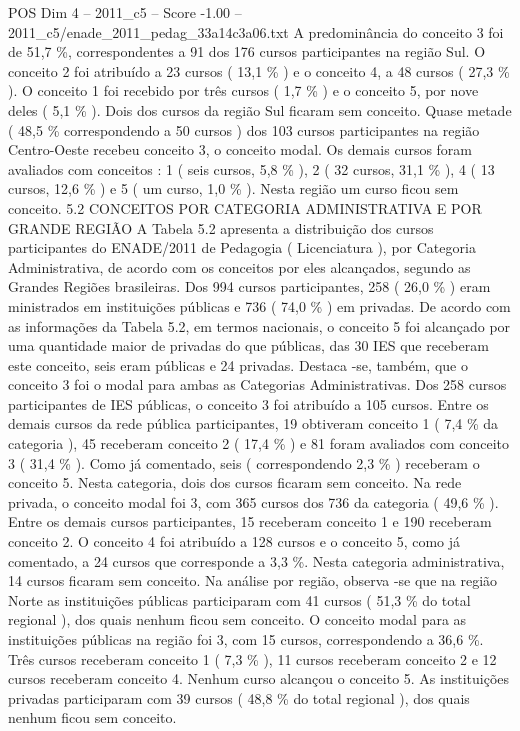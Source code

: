\begin{textsample}{POS Dim 4 – 2011\_c5 – Score -1.00 – 2011\_c5/enade\_2011\_pedag\_33a14c3a06.txt}
A predominância do conceito 3 foi de 51,7 \%, correspondentes a 91 dos 176 cursos participantes na região Sul.
O conceito 2 foi atribuído a 23 cursos ( 13,1 \% ) e o conceito 4, a 48 cursos ( 27,3 \% ).
O conceito 1 foi recebido por três cursos ( 1,7 \% ) e o conceito 5, por nove deles ( 5,1 \% ).
Dois dos cursos da região Sul ficaram sem conceito.
Quase metade ( 48,5 \% correspondendo a 50 cursos ) dos 103 cursos participantes na região Centro-Oeste recebeu conceito 3, o conceito modal.
Os demais cursos foram avaliados com conceitos : 1 ( seis cursos, 5,8 \% ), 2 ( 32 cursos, 31,1 \% ), 4 ( 13 cursos, 12,6 \% ) e 5 ( um curso, 1,0 \% ).
Nesta região um curso ficou sem conceito. 5.2 CONCEITOS POR CATEGORIA ADMINISTRATIVA E POR GRANDE REGIÃO A Tabela 5.2 apresenta a distribuição dos cursos participantes do ENADE/2011 de Pedagogia ( Licenciatura ), por Categoria Administrativa, de acordo com os conceitos por eles alcançados, segundo as Grandes Regiões brasileiras.
Dos 994 cursos participantes, 258 ( 26,0 \% ) eram ministrados em instituições públicas e 736 ( 74,0 \% ) em privadas.
De acordo com as informações da Tabela 5.2, em termos nacionais, o conceito 5 foi alcançado por uma quantidade maior de privadas do que públicas, das 30 IES que receberam este conceito, seis eram públicas e 24 privadas.
Destaca -se, também, que o conceito 3 foi o modal para ambas as Categorias Administrativas.
Dos 258 cursos participantes de IES públicas, o conceito 3 foi atribuído a 105 cursos.
Entre os demais cursos da rede pública participantes, 19 obtiveram conceito 1 ( 7,4 \% da categoria ), 45 receberam conceito 2 ( 17,4 \% ) e 81 foram avaliados com conceito 3 ( 31,4 \% ).
Como já comentado, seis ( correspondendo 2,3 \% ) receberam o conceito 5.
Nesta categoria, dois dos cursos ficaram sem conceito.
Na rede privada, o conceito modal foi 3, com 365 cursos dos 736 da categoria ( 49,6 \% ).
Entre os demais cursos participantes, 15 receberam conceito 1 e 190 receberam conceito 2.
O conceito 4 foi atribuído a 128 cursos e o conceito 5, como já comentado, a 24 cursos que corresponde a 3,3 \%.
Nesta categoria administrativa, 14 cursos ficaram sem conceito.
Na análise por região, observa -se que na região Norte as instituições públicas participaram com 41 cursos ( 51,3 \% do total regional ), dos quais nenhum ficou sem conceito.
O conceito modal para as instituições públicas na região foi 3, com 15 cursos, correspondendo a 36,6 \%.
Três cursos receberam conceito 1 ( 7,3 \% ), 11 cursos receberam conceito 2 e 12 cursos receberam conceito 4.
Nenhum curso alcançou o conceito 5.
As instituições privadas participaram com 39 cursos ( 48,8 \% do total regional ), dos quais nenhum ficou sem conceito.

\end{textsample}
